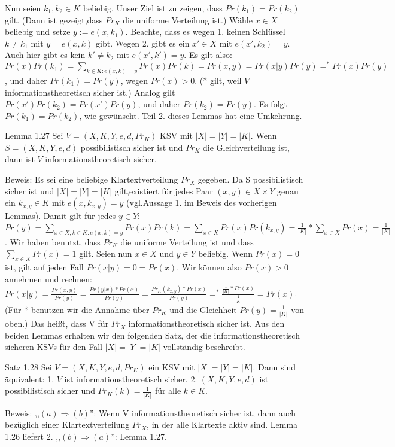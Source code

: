\documentclass[a4paper]{article}
\begin{document}
\begin{multicols}{3}
    Nun seien $k_1,k_2\in K$ beliebig. Unser Ziel ist zu zeigen, dass $Pr(k_1)=Pr(k_2)$ gilt. (Dann ist gezeigt,dass $Pr_K$ die uniforme Verteilung ist.) Wähle $x\in X$ beliebig und setze $y:=e(x,k_1)$. Beachte, dass es wegen 1. keinen Schlüssel $k\not=k_1$ mit $y=e(x,k)$ gibt. Wegen 2. gibt es ein $x′\in X$ mit $e(x′,k_2)=y$. Auch hier gibt es kein $k′\not=k_2$ mit $e(x′,k′)=y$. Es gilt also: $Pr(x)Pr(k_1)=\sum_{k\in K:e(x,k)=y} Pr(x)Pr(k) = Pr(x,y) = Pr(x|y)Pr(y) =^* Pr(x)Pr(y)$, und daher $Pr(k_1)=Pr(y)$, wegen $Pr(x)>0$. (* gilt, weil $V$ informationstheoretisch sicher ist.) Analog gilt $Pr(x′)Pr(k_2)=Pr(x′)Pr(y)$, und daher $Pr(k_2)=Pr(y)$. Es folgt $Pr(k_1)=Pr(k_2)$, wie gewünscht.
    Teil 2. dieses Lemmas hat eine Umkehrung.

    Lemma 1.27 Sei $V=(X,K,Y,e,d,Pr_K)$ KSV mit $|X|=|Y|=|K|$. Wenn $S=(X,K,Y,e,d)$ possibilistisch sicher ist und $Pr_K$ die Gleichverteilung ist, dann ist $V$ informationstheoretisch sicher.

    Beweis: Es sei eine beliebige Klartextverteilung $Pr_X$ gegeben. Da S possibilistisch sicher ist und $|X|=|Y|=|K|$ gilt,existiert für jedes Paar $(x,y)\in X\times Y$ genau ein $k_{x,y}\in K$ mit $e(x,k_{x,y}) =y$ (vgl.Aussage 1. im Beweis des vorherigen Lemmas).
    Damit gilt für jedes $y\in Y$:$Pr(y)=\sum_{x\in X,k\in K:e(x,k)=y} Pr(x)Pr(k) =\sum_{x\in X} Pr(x) Pr(k_{x,y})=\frac{1}{|K|}* \sum_{x\in X} Pr(x) = \frac{1}{|K|}$.
    Wir haben benutzt, dass $Pr_K$ die uniforme Verteilung ist und dass $\sum_{x\in X} Pr(x) = 1$ gilt.
    Seien nun $x\in X$ und $y\in Y$ beliebig. Wenn $Pr(x)=0$ ist, gilt auf jeden Fall $Pr(x|y)=0=Pr(x)$. Wir können also $Pr(x)> 0$ annehmen und rechnen: $Pr(x|y) =\frac{Pr(x,y)}{Pr(y)}=\frac{Pr(y|x)*Pr(x)}{Pr(y)}=\frac{Pr_K(k_{x,y})*Pr(x)}{Pr(y)}=^* \frac{\frac{1}{|K|}*Pr(x)}{\frac{1}{|K|}}=Pr(x)$.
    (Für * benutzen wir die Annahme über $Pr_K$ und die Gleichheit $Pr(y)=\frac{1}{|K|}$ von oben.) Das heißt, dass V  für $Pr_X$ informationstheoretisch sicher ist.
    Aus den beiden Lemmas erhalten wir den folgenden Satz, der die informationstheoretisch sicheren KSVs für den Fall $|X|=|Y|=|K|$ vollständig beschreibt.

    Satz 1.28 Sei $V= (X,K,Y,e,d,Pr_K)$ ein KSV mit $|X|=|Y|=|K|$. Dann sind äquivalent:
    1. $V$ ist informationstheoretisch sicher.
    2. $(X,K,Y,e,d)$ ist possibilistisch sicher und $Pr_K(k)=\frac{1}{|K|}$ für alle $k\in K$.

    Beweis:  ,,$(a)\Rightarrow (b)$'': Wenn V informationstheoretisch sicher ist, dann auch bezüglich einer Klartextverteilung $Pr_X$, in der alle Klartexte aktiv sind. Lemma 1.26 liefert 2. ,,$(b)\Rightarrow (a)$'': Lemma 1.27.


\end{multicols}
\end{document}

